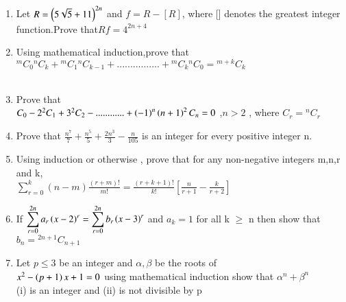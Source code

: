 \documentclass[journal,12pt,twocolumn]{IEEEtran}
\theoremstyle{remark}
\begin{document}
\begin{enumerate}
	    \item Let $R =\left(5\sqrt{5}+11\right)^{2n}$ and $f = R -[R] $, where [] denotes the greatest integer function.Prove  that$ Rf =4^{2n+4}$  \hfill {}\\

	    \item Using mathematical induction,prove that
		    ${}^mC_0{}^nC_k +{}^mC_1{}^nC_{k-1}+................+{}^mC_k{}^nC_0 ={}^{m+k}C_k$\\\hfill {}\\
	    \item Prove that \hfill{}\\$C_0-2^2C_1+3^2C_2-............+\left(-1\right)^n\left(n+1\right)^2C_n =0$ ,$n>2$ , where $C_r={}^nC_r$\\

	    \item Prove that   $ \frac{n^7}{7}+\frac{n^5}{5}+\frac{2n^3}{3}-\frac{n}{105}$ is an integer for every positive integer n. \hfill{}\\


	    \item Using induction or otherwise , prove that for any non-negative integers m,n,r and k,\\$\displaystyle\sum_{r=0}^{k}(n-m)\frac{(r+m)!}{m!}= \frac{(r+k+1)!}{k!}[\frac{n}{r+1}-\frac{k}{r+2}]$ \hfill{}

	    \item If $\displaystyle\sum_{r=0}^{2n}a_r\left(x-2\right)^r=\displaystyle\sum_{r=0}^{2n}b_r$$\left(x-3\right)^r$ and $a_k =1$ for all k $\geq$ n then show that $b_n = {}^{2n+1}C_{n+1}$ \hfill {}

	    \item Let  $p\leq 3$ be an integer and $\alpha,\beta$ be  the roots of\\  $x^2-\left(p+1\right)x+1=0 $ using mathematical induction show that $\alpha^n +\beta^n$\\ (i) is an integer and   
		    (ii) is not divisible by p  \hfill{}
		    
 \end{enumerate}
 
\end{document}
